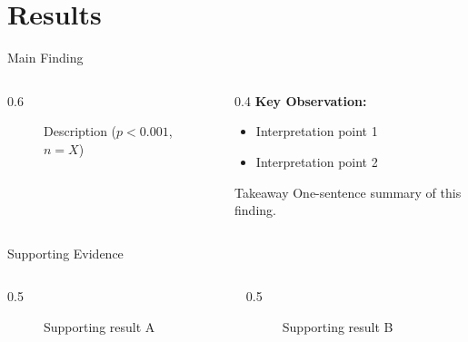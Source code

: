 \documentclass[aspectratio=169,11pt]{beamer}
\begin{document}
\section{Results}

\begin{frame}{Main Finding}
  \begin{columns}[c]
    \begin{column}{0.6\textwidth}
      \begin{figure}
        \caption{Description ($p < 0.001$, $n = X$)}
      \end{figure}
    \end{column}
    \begin{column}{0.4\textwidth}
      \textbf{Key Observation:}
      \begin{itemize}
        \item Interpretation point 1
        \item Interpretation point 2
      \end{itemize}
      \begin{block}{Takeaway}
        One-sentence summary of this finding.
      \end{block}
    \end{column}
  \end{columns}
\end{frame}

\begin{frame}{Supporting Evidence}
  \begin{columns}[T]
    \begin{column}{0.5\textwidth}
      \begin{figure}
        \framebox[0.9\textwidth][c]{[Figure A]}
        \caption{Supporting result A}
      \end{figure}
    \end{column}
    \begin{column}{0.5\textwidth}
      \begin{figure}
        \framebox[0.9\textwidth][c]{[Figure B]}
        \caption{Supporting result B}
      \end{figure}
    \end{column}
  \end{columns}
\end{frame}
\end{document}
